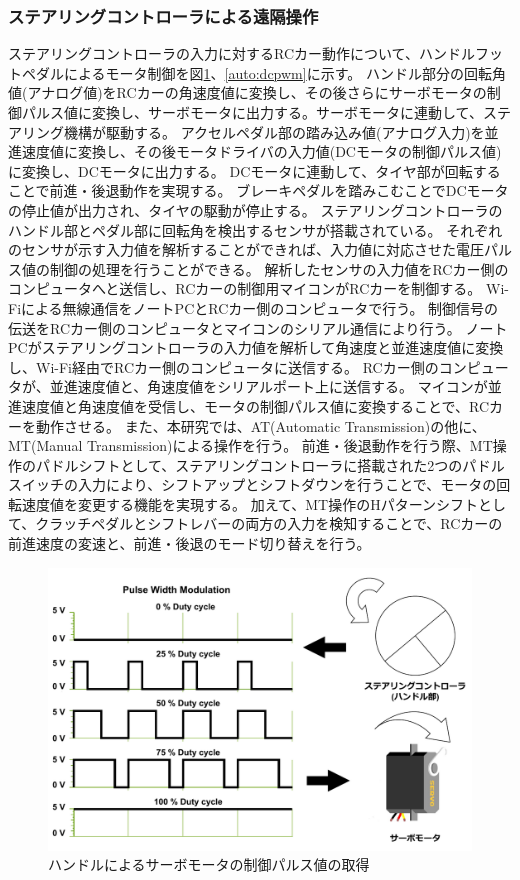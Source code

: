 \subsubsection{ステアリングコントローラによる遠隔操作}
ステアリングコントローラの入力に対するRCカー動作について、ハンドルフットペダルによるモータ制御を図\ref{auto:servopwm}、\ref{auto:dcpwm}に示す。
ハンドル部分の回転角値(アナログ値)をRCカーの角速度値に変換し、その後さらにサーボモータの制御パルス値に変換し、サーボモータに出力する。サーボモータに連動して、ステアリング機構が駆動する。
アクセルペダル部の踏み込み値(アナログ入力)を並進速度値に変換し、その後モータドライバの入力値(DCモータの制御パルス値)に変換し、DCモータに出力する。
DCモータに連動して、タイヤ部が回転することで前進・後退動作を実現する。
ブレーキペダルを踏みこむことでDCモータの停止値が出力され、タイヤの駆動が停止する。
ステアリングコントローラのハンドル部とペダル部に回転角を検出するセンサが搭載されている。
それぞれのセンサが示す入力値を解析することができれば、入力値に対応させた電圧パルス値の制御の処理を行うことができる。
解析したセンサの入力値をRCカー側のコンピュータへと送信し、RCカーの制御用マイコンがRCカーを制御する。
Wi-Fiによる無線通信をノートPCとRCカー側のコンピュータで行う。
制御信号の伝送をRCカー側のコンピュータとマイコンのシリアル通信により行う。
ノートPCがステアリングコントローラの入力値を解析して角速度と並進速度値に変換し、Wi-Fi経由でRCカー側のコンピュータに送信する。
RCカー側のコンピュータが、並進速度値と、角速度値をシリアルポート上に送信する。
マイコンが並進速度値と角速度値を受信し、モータの制御パルス値に変換することで、RCカーを動作させる。
また、本研究では、AT(Automatic Transmission)の他に、MT(Manual Transmission)による操作を行う。
前進・後退動作を行う際、MT操作のパドルシフトとして、ステアリングコントローラに搭載された2つのパドルスイッチの入力により、シフトアップとシフトダウンを行うことで、モータの回転速度値を変更する機能を実現する。
加えて、MT操作のHパターンシフトとして、クラッチペダルとシフトレバーの両方の入力を検知することで、RCカーの前進速度の変速と、前進・後退のモード切り替えを行う。
\begin{figure}[h]
  \begin{center}
    \includegraphics[width=.75\linewidth]{img/auto_3.pdf}
    \caption{ハンドルによるサーボモータの制御パルス値の取得}
    \label{auto:servopwm}
  \end{center}
\end{figure}

